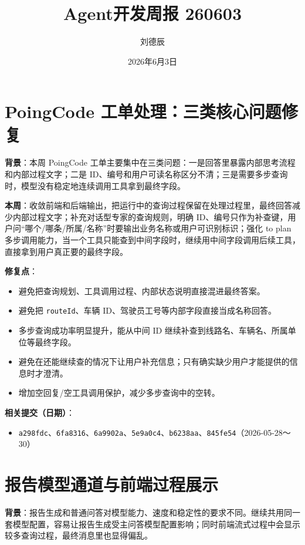 \documentclass[UTF8]{ctexart}
\title{Agent开发周报 260603}
\author{刘德辰}
\date{2026年6月3日}
\begin{document}
\maketitle

\section{PoingCode 工单处理：三类核心问题修复}

\textbf{背景}：本周 PoingCode 工单主要集中在三类问题：一是回答里暴露内部思考流程和内部过程文字；二是 ID、编号和用户可读名称区分不清；三是需要多步查询时，模型没有稳定地连续调用工具拿到最终字段。

\textbf{本周}：收敛前端和后端输出，把运行中的查询过程保留在处理过程里，最终回答减少内部过程文字；补充对话型专家的查询规则，明确 ID、编号只作为补查键，用户问“哪个/哪条/所属/名称”时要输出业务名称或用户可识别标识；强化 to plan 多步调用能力，当一个工具只能查到中间字段时，继续用中间字段调用后续工具，直接拿到用户真正要的最终字段。

\textbf{修复点}：
\begin{itemize}
\item 避免把查询规划、工具调用过程、内部状态说明直接混进最终答案。
\item 避免把 \texttt{routeId}、车辆 ID、驾驶员工号等内部字段直接当成名称回答。
\item 多步查询成功率明显提升，能从中间 ID 继续补查到线路名、车辆名、所属单位等最终字段。
\item 避免在还能继续查的情况下让用户补充信息；只有确实缺少用户才能提供的信息时才澄清。
\item 增加空回复/空工具调用保护，减少多步查询中的空转。
\end{itemize}

\textbf{相关提交（日期）}：
\begin{itemize}
\item \texttt{a298fdc}、\texttt{6fa8316}、\texttt{6a9902a}、\texttt{5e9a0c4}、\texttt{b6238aa}、\texttt{845fe54}（2026-05-28～30）
\end{itemize}

\section{报告模型通道与前端过程展示}

\textbf{背景}：报告生成和普通问答对模型能力、速度和稳定性的要求不同。继续共用同一套模型配置，容易让报告生成受主问答模型配置影响；同时前端流式过程中会显示较多查询过程，最终消息里也显得偏乱。
\end{document}
